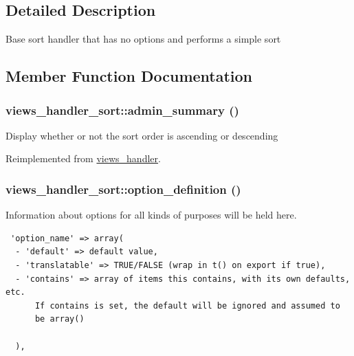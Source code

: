 \subsection{Detailed Description}
Base sort handler that has no options and performs a simple sort 

\subsection{Member Function Documentation}
\hypertarget{classviews__handler__sort_94271a6ce69bf4acb37047b01f0decaa}{
\subsubsection[{admin\_\-summary}]{\setlength{\rightskip}{0pt plus 5cm}views\_\-handler\_\-sort::admin\_\-summary ()}}
\label{classviews__handler__sort_94271a6ce69bf4acb37047b01f0decaa}


Display whether or not the sort order is ascending or descending 

Reimplemented from \hyperlink{classviews__handler_27a5cb35f3f17322957730a95b6be11e}{views\_\-handler}.\hypertarget{classviews__handler__sort_f1e8382befe67b9cd07d0bbfa9b98266}{
\subsubsection[{option\_\-definition}]{\setlength{\rightskip}{0pt plus 5cm}views\_\-handler\_\-sort::option\_\-definition ()}}
\label{classviews__handler__sort_f1e8382befe67b9cd07d0bbfa9b98266}


Information about options for all kinds of purposes will be held here. 

\begin{Code}\begin{verbatim} 'option_name' => array(
  - 'default' => default value,
  - 'translatable' => TRUE/FALSE (wrap in t() on export if true),
  - 'contains' => array of items this contains, with its own defaults, etc.
      If contains is set, the default will be ignored and assumed to
      be array()

  ),
\end{verbatim}
\end{Code}

